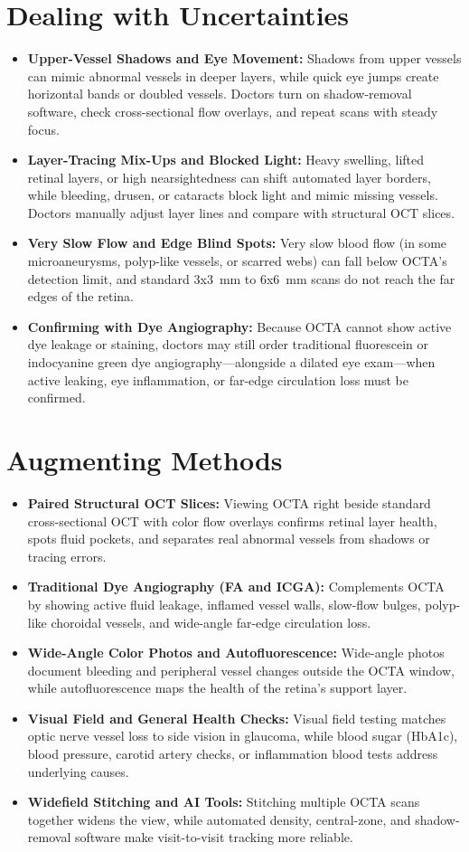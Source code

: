 \section{Dealing with Uncertainties}
\begin{itemize}
\item \textbf{Upper-Vessel Shadows and Eye Movement:} Shadows from upper vessels can mimic abnormal vessels in deeper layers, while quick eye jumps create horizontal bands or doubled vessels. Doctors turn on shadow-removal software, check cross-sectional flow overlays, and repeat scans with steady focus.
\item \textbf{Layer-Tracing Mix-Ups and Blocked Light:} Heavy swelling, lifted retinal layers, or high nearsightedness can shift automated layer borders, while bleeding, drusen, or cataracts block light and mimic missing vessels. Doctors manually adjust layer lines and compare with structural OCT slices.
\item \textbf{Very Slow Flow and Edge Blind Spots:} Very slow blood flow (in some microaneurysms, polyp-like vessels, or scarred webs) can fall below OCTA's detection limit, and standard 3x3~mm to 6x6~mm scans do not reach the far edges of the retina.
\item \textbf{Confirming with Dye Angiography:} Because OCTA cannot show active dye leakage or staining, doctors may still order traditional fluorescein or indocyanine green dye angiography---alongside a dilated eye exam---when active leaking, eye inflammation, or far-edge circulation loss must be confirmed.
\end{itemize}

\section{Augmenting Methods}
\begin{itemize}
\item \textbf{Paired Structural OCT Slices:} Viewing OCTA right beside standard cross-sectional OCT with color flow overlays confirms retinal layer health, spots fluid pockets, and separates real abnormal vessels from shadows or tracing errors.
\item \textbf{Traditional Dye Angiography (FA and ICGA):} Complements OCTA by showing active fluid leakage, inflamed vessel walls, slow-flow bulges, polyp-like choroidal vessels, and wide-angle far-edge circulation loss.
\item \textbf{Wide-Angle Color Photos and Autofluorescence:} Wide-angle photos document bleeding and peripheral vessel changes outside the OCTA window, while autofluorescence maps the health of the retina's support layer.
\item \textbf{Visual Field and General Health Checks:} Visual field testing matches optic nerve vessel loss to side vision in glaucoma, while blood sugar (HbA1c), blood pressure, carotid artery checks, or inflammation blood tests address underlying causes.
\item \textbf{Widefield Stitching and AI Tools:} Stitching multiple OCTA scans together widens the view, while automated density, central-zone, and shadow-removal software make visit-to-visit tracking more reliable.
\end{itemize}

